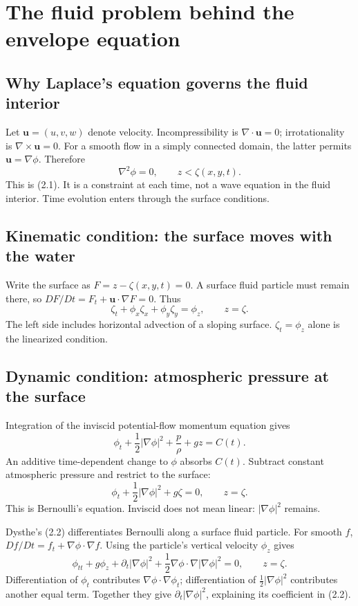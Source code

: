 \section{The fluid problem behind the envelope equation}
\label{sec:fluid}
\subsection{Why Laplace's equation governs the fluid interior}
Let $\boldsymbol{u}=(u,v,w)$ denote velocity. Incompressibility is
$\nabla\cdot\boldsymbol{u}=0$; irrotationality is
$\nabla\times\boldsymbol{u}=0$. For a smooth flow in a simply connected
domain, the latter permits $\boldsymbol{u}=\nabla\phi$. Therefore
\begin{equation}\label{eq:laplace}
 \nabla^2\phi=0,\qquad z<\zeta(x,y,t).
\end{equation}
This is (2.1). It is a constraint at each time, not a wave equation in the
fluid interior. Time evolution enters through the surface conditions.

\subsection{Kinematic condition: the surface moves with the water}
Write the surface as $F=z-\zeta(x,y,t)=0$. A surface fluid particle must
remain there, so $DF/Dt=F_t+\boldsymbol{u}\cdot\nabla F=0$. Thus
\begin{equation}\label{eq:kinematic}
 \zeta_t+\phi_x\zeta_x+\phi_y\zeta_y=\phi_z,
 \qquad z=\zeta.
\end{equation}
The left side includes horizontal advection of a sloping surface.
$\zeta_t=\phi_z$ alone is the linearized condition.

\subsection{Dynamic condition: atmospheric pressure at the surface}
Integration of the inviscid potential-flow momentum equation gives
\[
 \phi_t+\frac12|\nabla\phi|^2+\frac p\rho+gz=C(t).
\]
An additive time-dependent change to $\phi$ absorbs $C(t)$. Subtract
constant atmospheric pressure and restrict to the surface:
\begin{equation}\label{eq:bernoulli}
 \phi_t+\frac12|\nabla\phi|^2+g\zeta=0,
 \qquad z=\zeta.
\end{equation}
This is Bernoulli's equation. Inviscid does not mean linear:
$|\nabla\phi|^2$ remains.

Dysthe's (2.2) differentiates Bernoulli along a surface fluid particle.
For smooth $f$, $Df/Dt=f_t+\nabla\phi\cdot\nabla f$.
Using the particle's vertical velocity $\phi_z$ gives
\begin{equation}\label{eq:dysthe-dynamic}
 \phi_{tt}+g\phi_z+\partial_t|\nabla\phi|^2
 +\frac12\nabla\phi\cdot\nabla|\nabla\phi|^2=0,
 \qquad z=\zeta.
\end{equation}
Differentiation of $\phi_t$ contributes
$\nabla\phi\cdot\nabla\phi_t$; differentiation of
$\tfrac12|\nabla\phi|^2$ contributes another equal term. Together they
give $\partial_t|\nabla\phi|^2$, explaining its coefficient in (2.2).

